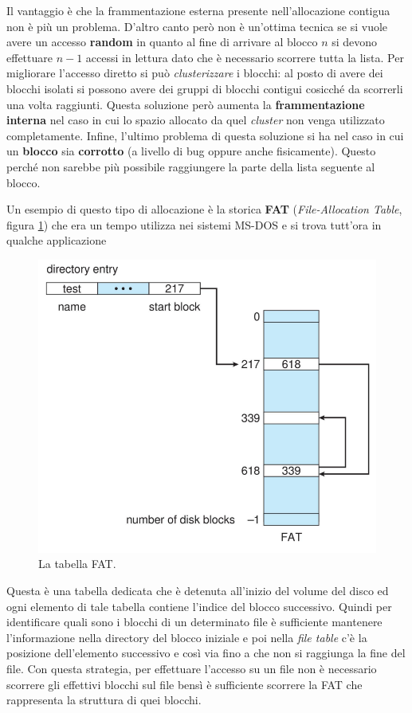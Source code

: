 Il vantaggio è che la frammentazione esterna presente nell'allocazione contigua non è più un problema. D'altro canto però non è un'ottima tecnica se si vuole avere un accesso \textbf{random} in quanto al fine di arrivare al blocco $n$ si devono effettuare $n - 1$ accessi in lettura dato che è necessario scorrere tutta la lista. Per migliorare l'accesso diretto si può \textit{clusterizzare} i blocchi: al posto di avere dei blocchi isolati si possono avere dei gruppi di blocchi contigui cosicché da scorrerli una volta raggiunti. Questa soluzione però aumenta la \textbf{frammentazione interna} nel caso in cui lo spazio allocato da quel \textit{cluster} non venga utilizzato completamente. Infine, l'ultimo problema di questa soluzione si ha nel caso in cui un \textbf{blocco} sia \textbf{corrotto} (a livello di bug oppure anche fisicamente). Questo perché non sarebbe più possibile raggiungere la parte della lista seguente al blocco.

Un esempio di questo tipo di allocazione è la storica \textbf{FAT} (\textit{File-Allocation Table}, figura \ref{fig:FAT})\label{FAT} che era un tempo utilizza nei sistemi MS-DOS e si trova tutt'ora in qualche applicazione
\begin{figure}[h]
    \centering
    \includegraphics[width = .55\textwidth]{../res/imgs/file system implementation/FAT.png}
    \caption{La tabella FAT.}
    \label{fig:FAT}
\end{figure}
Questa è una tabella dedicata che è detenuta all'inizio del volume del disco ed ogni elemento di tale tabella contiene l'indice del blocco successivo. Quindi per identificare quali sono i blocchi di un determinato file è sufficiente mantenere l'informazione nella directory del blocco iniziale e poi nella \textit{file table} c'è la posizione dell'elemento successivo e così via fino a che non si raggiunga la fine del file. Con questa strategia, per effettuare l'accesso su un file non è necessario scorrere gli effettivi blocchi sul file bensì è sufficiente scorrere la FAT che rappresenta la struttura di quei blocchi. 

